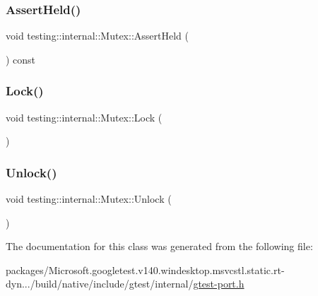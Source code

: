 \subsubsection{\texorpdfstring{AssertHeld()}{AssertHeld()}}
{\footnotesize\ttfamily void testing\+::internal\+::\+Mutex\+::\+Assert\+Held (\begin{DoxyParamCaption}{ }\end{DoxyParamCaption}) const\hspace{0.3cm}{\ttfamily [inline]}}

\mbox{\label{classtesting_1_1internal_1_1_mutex_ae7e2191886c00182176b23c4f4d049f8}} 
\subsubsection{\texorpdfstring{Lock()}{Lock()}}
{\footnotesize\ttfamily void testing\+::internal\+::\+Mutex\+::\+Lock (\begin{DoxyParamCaption}{ }\end{DoxyParamCaption})\hspace{0.3cm}{\ttfamily [inline]}}

\mbox{\label{classtesting_1_1internal_1_1_mutex_a315188055de1be98884519ad84eff2e6}} 
\subsubsection{\texorpdfstring{Unlock()}{Unlock()}}
{\footnotesize\ttfamily void testing\+::internal\+::\+Mutex\+::\+Unlock (\begin{DoxyParamCaption}{ }\end{DoxyParamCaption})\hspace{0.3cm}{\ttfamily [inline]}}



The documentation for this class was generated from the following file\+:\begin{DoxyCompactItemize}
\item 
packages/\+Microsoft.\+googletest.\+v140.\+windesktop.\+msvcstl.\+static.\+rt-\/dyn.../build/native/include/gtest/internal/\mbox{\hyperlink{gtest-port_8h}{gtest-\/port.\+h}}\end{DoxyCompactItemize}
